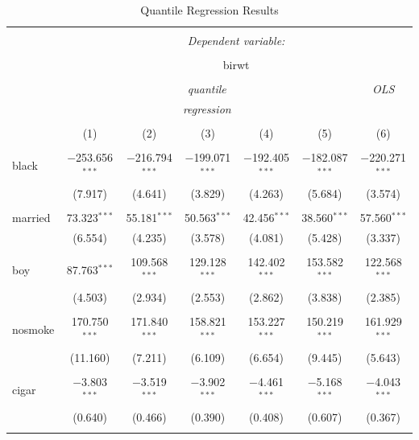 \documentclass[]{book}
\begin{document}
\begin{table}[!htbp] \centering
  \caption{Quantile Regression Results}
  \label{tab:}
\begin{tabular}{@{\extracolsep{5pt}}lcccccc}
\\[-1.8ex]\hline
\hline \\[-1.8ex]
 & \multicolumn{6}{c}{\textit{Dependent variable:}} \\
\cline{2-7}
\\[-1.8ex] & \multicolumn{6}{c}{birwt} \\
\\[-1.8ex] & \multicolumn{5}{c}{\textit{quantile}} & \textit{OLS} \\
 & \multicolumn{5}{c}{\textit{regression}} & \textit{} \\
\\[-1.8ex] & (1) & (2) & (3) & (4) & (5) & (6)\\
\hline \\[-1.8ex]
 black & $-$253.656$^{***}$ & $-$216.794$^{***}$ & $-$199.071$^{***}$ & $-$192.405$^{***}$ & $-$182.087$^{***}$ & $-$220.271$^{***}$ \\
  & (7.917) & (4.641) & (3.829) & (4.263) & (5.684) & (3.574) \\
  & & & & & & \\
 married & 73.323$^{***}$ & 55.181$^{***}$ & 50.563$^{***}$ & 42.456$^{***}$ & 38.560$^{***}$ & 57.560$^{***}$ \\
  & (6.554) & (4.235) & (3.578) & (4.081) & (5.428) & (3.337) \\
  & & & & & & \\
 boy & 87.763$^{***}$ & 109.568$^{***}$ & 129.128$^{***}$ & 142.402$^{***}$ & 153.582$^{***}$ & 122.568$^{***}$ \\
  & (4.503) & (2.934) & (2.553) & (2.862) & (3.838) & (2.385) \\
  & & & & & & \\
 nosmoke & 170.750$^{***}$ & 171.840$^{***}$ & 158.821$^{***}$ & 153.227$^{***}$ & 150.219$^{***}$ & 161.929$^{***}$ \\
  & (11.160) & (7.211) & (6.109) & (6.654) & (9.445) & (5.643) \\
  & & & & & & \\
 cigar & $-$3.803$^{***}$ & $-$3.519$^{***}$ & $-$3.902$^{***}$ & $-$4.461$^{***}$ & $-$5.168$^{***}$ & $-$4.043$^{***}$ \\
  & (0.640) & (0.466) & (0.390) & (0.408) & (0.607) & (0.367) \\
  & & & & & & \\

\end{tabular}
\end{table}
\end{document}
